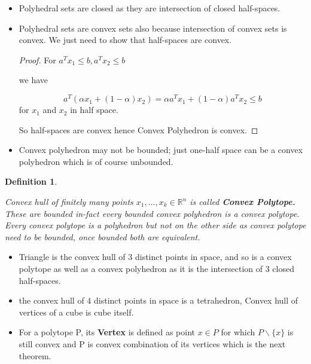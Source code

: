\documentclass[oneside]{book}
\newtheorem{mydef}{Definition}[section]
\begin{document}
	
	\begin{itemize}
		\item
		Polyhedral sets are closed as they are intersection of closed half-spaces. 
		\item
		Polyhedral sets  are convex sets  also because intersection of convex sets is convex. We just need to show that half-spaces are convex.\par
		\begin{proof}
			For $a^{T} x_{1} \leq b, a^{T} x_{2} \leq b$ \par 
			we have 
			
			$$a^{T}\left(\alpha x_{1} +(1- \alpha) x_{2}\right)=\alpha a^{T} x_{1}+(1-\alpha) a^{T} x_{2} \leq b$$ 
			for $x_{1} $ and $x_{2}$ in half space.  \par
			So half-spaces are convex hence  Convex Polyhedron  is convex.\par 
		\end{proof}
		
		\item
		Convex polyhedron may not be bounded; just one-half space can be a convex polyhedron which is of course unbounded. 
	\end{itemize}
	
	\begin{mydef} \label{d:6}
		
		Convex hull of finitely many points $x_1,\ldots ,x_k \in \mathbb{R}^n $ is called \textbf{Convex Polytope.} 
		These are bounded in-fact every bounded convex polyhedron is a convex polytope.\\
		Every convex polytope is a polyhedron but not on the other side as convex polytope need to be bounded, once bounded both are equivalent.
		
		
	\end{mydef}
	
	
	\begin{itemize}
		\item
		
		Triangle is the convex hull of 3 distinct points in space, and so is a convex polytope as well as a convex polyhedron as it is the intersection of 3 closed half-spaces.
		
		\item
		the convex hull of 4 distinct points in space is a tetrahedron, Convex hull of vertices of a cube is cube itself. 
		
		\item
		For a polytope P, its \textbf{Vertex} is defined as point $x \in P$ for which $P \backslash \{x\} $ is  still convex and P is convex combination of its vertices which is  the next theorem. 
	\end{itemize}
	
\end{document}
